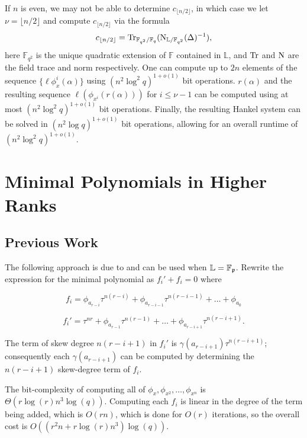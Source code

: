 \documentclass[sigconf]{acmart}
\newcommand{\F}{\mathbb{F}}
\renewcommand{\L}{\mathbb{L}}
\begin{document}
If $n$ is even, we may not be able to determine $c_{\lfloor n/2 \rfloor}$, in which case we let $\nu = \lfloor n/2 \rfloor$ and compute $c_{\lfloor n/2 \rfloor}$ via the formula
\begin{equation*}
    c_{\lfloor n/2 \rfloor} = \textnormal{Tr}_{\F_{q^2}/\F_{q}}(\textnormal{N}_{\L/\F_{q^2}}(\Delta)^{-1}),
\end{equation*}
here $\F_{q^2}$ is the unique quadratic extension of $\F$ contained in $\L$, and $\textnormal{Tr}$ and $\textnormal{N}$ are the field trace and norm respectively. One can compute up to $2n$ elements of the sequence $\{ \ell \phi_x^i(\alpha)\}$ using $(n^2 \log^2q)^{1 + o(1)}$ bit operations. $r(\alpha)$ and the resulting sequence $\ell(\phi_{x^i}(r(\alpha)))$ for $i \leq \nu -1$ can be computed using at most $(n^2 \log^2q)^{1 + o(1)}$ bit operations. Finally, the resulting Hankel system can be solved in $(n^2 \log q)^{1 + o(1)}$ bit operations, allowing for an overall runtime of $(n^2 \log^2q)^{1 + o(1)}$. 


\section{Minimal Polynomials in Higher Ranks}

\subsection{Previous Work}

The following approach is due to \cite{GaraiPapikian} and can be used when $\L = \F_{\frak{p}}$. Rewrite the expression for the minimal polynomial as $f_i' + f_i = 0$ where

\[ f_i = \phi_{a_{r-i}}\tau^{n (r-i)} + \phi_{a_{r - i -1 }}\tau^{n (r-i-1)} + \ldots + \phi_{a_0} \]

\[ f_i' = \tau^{nr} + \phi_{a_{r -1 }}\tau^{n (r-1)} + \ldots + \phi_{a_{r-i + 1}}\tau^{n(r - i + 1)}. \]

The term of skew degree $n(r - i + 1)$ in $f_i'$ is  $\gamma(a_{r-i+1}) \tau^{n(r-i + 1)}$; consequently each $\gamma(a_{r-i+1})$ can be computed by determining the $n(r - i + 1)$ skew-degree term of $f_i$.

The bit-complexity of computing all of $\phi_x, \phi_{x^2}, \ldots, \phi_{x^n}$ is \newline
$\Theta(r\log(r)n^3\log(q))$. Computing each $f_i$ is linear in the degree of the term being added, which is $O(rn)$, which is done for $O(r)$ iterations, so the overall cost is $O((r^2n + r\log(r)n^3)\log(q) )$.
\end{document}
